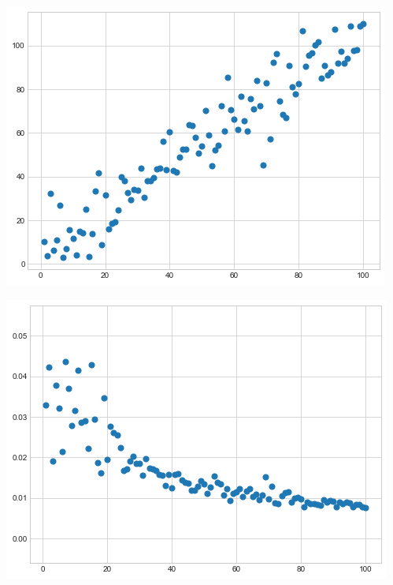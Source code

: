 \documentclass[12pt, a4paper, oneside]{article}
\begin{document}
\begin{minipage}[t]{0.45\textwidth}
	\includegraphics[scale=0.38]{regr_pic_1.png}
\end{minipage}
\hfill
\begin{minipage}[t]{0.45\textwidth}
	\includegraphics[scale=0.38]{regr_pic_2.png}
\end{minipage}
\end{document}
